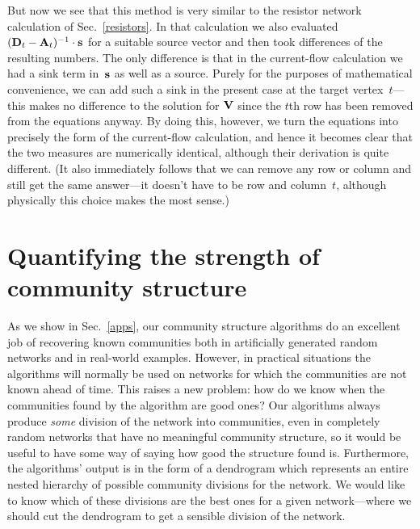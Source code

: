 \documentclass[twocolumn,pre,superscriptaddress]{revtex4}
\begin{document}
But now we see that this method is very similar to the resistor network
calculation of Sec.~\ref{resistors}.  In that calculation we also evaluated
$(\mathbf{D}_t-\mathbf{A}_t)^{-1}\cdot\mathbf{s}$ for a suitable source vector and then took
differences of the resulting numbers.  The only difference is that in the
current-flow calculation we had a sink term in~$\mathbf{s}$ as well as a source.
Purely for the purposes of mathematical convenience, we can add such a sink
in the present case at the target vertex~$t$---this makes no difference to
the solution for $\mathbf{V}$ since the $t$th row has been removed from the
equations anyway.  By doing this, however, we turn the equations into
precisely the form of the current-flow calculation, and hence it becomes
clear that the two measures are numerically identical, although their
derivation is quite different.  (It also immediately follows that we can
remove any row or column and still get the same answer---it doesn't have to
be row and column~$t$, although physically this choice makes the most
sense.)


\section{Quantifying the strength of community structure}
\label{gos}
As we show in Sec.~\ref{apps}, our community structure algorithms do an
excellent job of recovering known communities both in artificially
generated random networks and in real-world examples.  However, in
practical situations the algorithms will normally be used on networks for
which the communities are not known ahead of time.  This raises a new
problem: how do we know when the communities found by the algorithm are
good ones?  Our algorithms always produce \emph{some} division of the
network into communities, even in completely random networks that have no
meaningful community structure, so it would be useful to have some way of
saying how good the structure found is.  Furthermore, the algorithms'
output is in the form of a dendrogram which represents an entire nested
hierarchy of possible community divisions for the network.  We would like
to know which of these divisions are the best ones for a given
network---where we should cut the dendrogram to get a sensible division of
the network.
\end{document}
